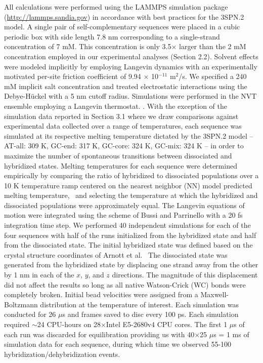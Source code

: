 \documentclass[journal=jpcbfk,manuscript=article]{achemso}
\newcommand*{\rood}[1]{{#1}}
\newcommand*{\roodr}[1]{{\color{red}{#1}}}
\begin{document}
All calculations were performed using the LAMMPS simulation package (\url{http://lammps.sandia.gov}) in accordance with best practices for the 3SPN.2 model. \citep{Plimpton1997FastDynamics} A single pair of self-complementary sequences were placed in a cubic periodic box with side length 7.8 nm corresponding to a single-strand concentration of \rood{7 mM}. \rood{This concentration is only 3.5$\times$ larger than the 2 mM concentration employed in our experimental analyses (Section 2.2).} Solvent effects were modeled implicitly by employing Langevin dynamics \citep{DunwegB.Paul1991BrownianNumbers., Bussi2007AccurateDynamics} with an experimentally motivated per-site friction coefficient of 9.94 $\times$ 10$^{-11}$ m$^2$/s. \citep{Nkodo2001DiffusionElectrophoresis, Hinckley2013AnHybridization} We specified a 240 mM implicit salt concentration and treated electrostatic interactions using the Debye-H{\"u}ckel with a 5 nm cutoff radius. \citep{Debye1923ZurElektrolyte} Simulations were performed in the NVT ensemble employing a Langevin thermostat. \citep{Schneider1978Molecular-dynamicsTransitions}. \rood{With the exception of the simulation data reported in Section 3.1 where we draw comparisons against experimental data collected over a range of temperatures,} each sequence was simulated at its respective melting temperature \roodr{at 7mM concentration as} dictated by the 3SPN.2 model -- AT-all: 309 K, GC-end: 317 K, GC-core: 324 K, GC-mix: 324 K -- in order to maximize the number of spontaneous transitions between dissociated and hybridized states. Melting temperatures for each sequence were determined empirically by comparing the ratio of hybridized to dissociated populations over a 10 K temperature ramp centered on the nearest neighbor (NN) model predicted melting temperature,~\citep{SantaLucia1998AThermodynamics, Santalucia2004TheMotifs} and selecting the temperature at which the hybridized and dissociated populations were approximately equal. The Langevin equations of motion were integrated using the scheme of Bussi and Parrinello \citep{Bussi2007AccurateDynamics} with a 20 fs integration time step. We performed 40 independent simulations for each of the four sequences with half of the runs initialized from the hybridized state and half from the dissociated state. The initial hybridized state was defined based on the crystal structure coordinates of Arnott et al.~\citep{Arnott1976CRCBiology} The dissociated state was generated from the hybridized state by displacing one strand away from the other by 1 nm in each of the $x$, $y$, and $z$ directions. The magnitude of this displacement did not affect the results so long as all native Watson-Crick (WC) bonds were completely broken. Initial bead velocities were assigned from a Maxwell-Boltzmann distribution at the temperature of interest. Each simulation was conducted for 26 $\mu$s and frames saved to disc every 100 ps. Each simulation required $\sim$24 CPU-hours on 28$\times$Intel E5-2680v4 CPU cores. The first 1 $\mu$s of each run was discarded for equilibration providing us with 40$\times$25 $\mu$s = 1 ms of simulation data for each sequence, during which time we observed 55-100 hybridization/dehybridization events.
\end{document}
